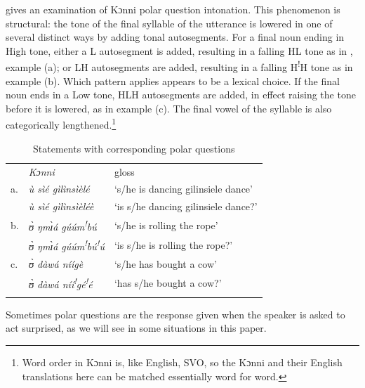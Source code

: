 \documentclass[output=paper]{langsci/langscibook}
\begin{document}
\citet{cahill2012} gives an examination of Kɔnni polar question intonation. This phenomenon is structural: the tone of the final syllable of the utterance is lowered in one of several distinct ways by adding tonal autosegments. For a final noun ending in High tone, either a L autosegment is added, resulting in a falling HL tone as in , example (a); or LH autosegments are added, resulting in a falling H\textsuperscript{!}H tone as in example (b). Which pattern applies appears to be a lexical choice. If the final noun ends in a Low tone, HLH autosegments are added, in effect raising the tone before it is lowered, as in example (c). The final vowel of the syllable is also categorically lengthened.\footnote{Word order in Kɔnni is, like English, SVO, so the Kɔnni and their English translations here can be matched essentially word for word.}

\begin{table}
\begin{tabular}{lll} & \emph{Kɔnni}  & gloss\\
\lsptoprule
a. & \emph{\`{u} sìé gìlìnsìèlé} & `s/he is dancing gilinsiele dance'\\
& \emph{ù sìé gìlìnsìèléè} & `is s/he dancing gilinsiele dance?'\\
b. & \emph{ʊ̀ ŋmɪ̀á gúúm\textsuperscript{!}bú} & `s/he is rolling the rope'\\
& \emph{ʊ̀ ŋmɪ̀á gúúm}\textit{\textsuperscript{!}}\emph{bú}\textit{\textsuperscript{!}}\emph{ú} & `is s/he is rolling the rope?'\\
c. & \emph{ʊ̀ dàwá níígè} & `s/he has bought a cow'\\
& \emph{ʊ̀ dàwá níí}\textit{\textsuperscript{!}}\emph{gé}\textit{\textsuperscript{!}}\emph{é} & `has s/he bought a cow?'\\
\lspbottomrule
\end{tabular}

\caption{Statements with corresponding polar questions}
\label{tab:1.cahill}

\end{table}



Sometimes polar questions are the response given when the speaker is asked to act surprised, as we will see in some situations in this paper. 
\end{document}
